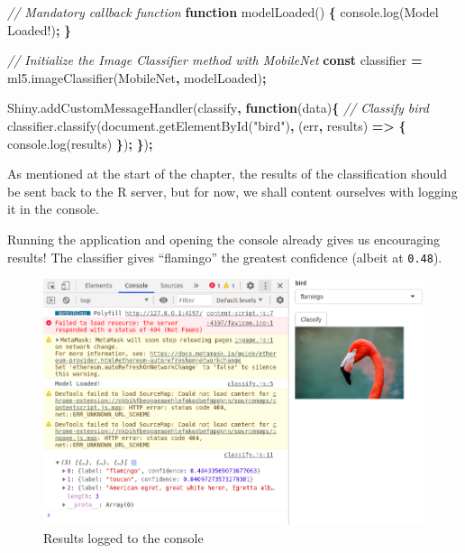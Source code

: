 \documentclass[
]{krantz}
\makeatletter
\newenvironment{Shaded}{\begin{snugshade}}{\end{snugshade}}
\newcommand{\AttributeTok}[1]{\textcolor[rgb]{0.61,0.61,0.61}{#1}}
\newcommand{\CommentTok}[1]{\textcolor[rgb]{0.37,0.37,0.37}{\textit{#1}}}
\newcommand{\KeywordTok}[1]{\textcolor[rgb]{0.27,0.27,0.27}{\textbf{#1}}}
\newcommand{\NormalTok}[1]{#1}
\newcommand{\OperatorTok}[1]{\textcolor[rgb]{0.43,0.43,0.43}{\textbf{#1}}}
\newcommand{\StringTok}[1]{\textcolor[rgb]{0.5,0.5,0.5}{#1}}
\newcommand{\VariableTok}[1]{\textcolor[rgb]{0,0,0}{#1}}
\newenvironment{kframe}{%
\medskip{}
\setlength{\fboxsep}{.8em}
 \def\at@end@of@kframe{}%
 \ifinner\ifhmode%
  \def\at@end@of@kframe{\end{minipage}}%
  \begin{minipage}{\columnwidth}%
 \fi\fi%
 \def\FrameCommand##1{\hskip\@totalleftmargin \hskip-\fboxsep
 \colorbox{shadecolor}{##1}\hskip-\fboxsep
     \hskip-\linewidth \hskip-\@totalleftmargin \hskip\columnwidth}%
 \MakeFramed {\advance\hsize-\width
   \@totalleftmargin\z@ \linewidth\hsize
   \@setminipage}}%
 {\par\unskip\endMakeFramed%
 \at@end@of@kframe}
\renewenvironment{Shaded}{\begin{kframe}}{\end{kframe}}
\makeatother
\begin{document}
\begin{Shaded}
\begin{Highlighting}[]
\CommentTok{// Mandatory callback function}
\KeywordTok{function} \AttributeTok{modelLoaded}\NormalTok{() }\OperatorTok{\{}
  \VariableTok{console}\NormalTok{.}\AttributeTok{log}\NormalTok{(}\StringTok{\textquotesingle{}Model Loaded!\textquotesingle{}}\NormalTok{)}\OperatorTok{;}
\OperatorTok{\}}

\CommentTok{// Initialize the Image Classifier method with MobileNet}
\KeywordTok{const}\NormalTok{ classifier }\OperatorTok{=} \VariableTok{ml5}\NormalTok{.}\AttributeTok{imageClassifier}\NormalTok{(}\StringTok{\textquotesingle{}MobileNet\textquotesingle{}}\OperatorTok{,}\NormalTok{ modelLoaded)}\OperatorTok{;}

\VariableTok{Shiny}\NormalTok{.}\AttributeTok{addCustomMessageHandler}\NormalTok{(}\StringTok{\textquotesingle{}classify\textquotesingle{}}\OperatorTok{,} \KeywordTok{function}\NormalTok{(data)}\OperatorTok{\{}
  \CommentTok{// Classify bird}
  \VariableTok{classifier}\NormalTok{.}\AttributeTok{classify}\NormalTok{(}\VariableTok{document}\NormalTok{.}\AttributeTok{getElementById}\NormalTok{(}\StringTok{"bird"}\NormalTok{)}\OperatorTok{,}\NormalTok{ (err}\OperatorTok{,}\NormalTok{ results) }\KeywordTok{=>} \OperatorTok{\{}
    \VariableTok{console}\NormalTok{.}\AttributeTok{log}\NormalTok{(results)}
  \OperatorTok{\}}\NormalTok{)}\OperatorTok{;}
\OperatorTok{\}}\NormalTok{)}\OperatorTok{;}
\end{Highlighting}
\end{Shaded}

As mentioned at the start of the chapter, the results of the classification should be sent back to the R server, but for now, we shall content ourselves with logging it in the console.

Running the application and opening the console already gives us encouraging results! The classifier gives ``flamingo'' the greatest confidence (albeit at \texttt{0.48}).

\begin{figure}[t]

{\centering \includegraphics[width=1\linewidth]{images/shiny-complete-classify-console} 

}

\caption{Results logged to the console}\label{fig:shiny-complete-classify-console}
\end{figure}
\end{document}
